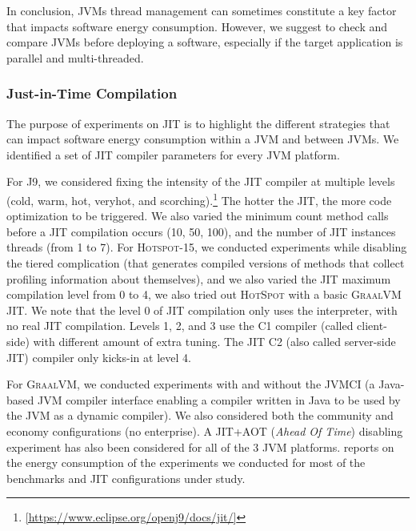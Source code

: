 In conclusion, JVMs thread management can sometimes constitute a key factor that impacts software energy consumption.
However, we suggest to check and compare JVMs before deploying a software, especially if the target application is parallel and multi-threaded.


\subsubsection{Just-in-Time Compilation}
The purpose of experiments on JIT is to highlight the different strategies that can impact software energy consumption within a JVM and between JVMs.
We identified a set of JIT compiler parameters for every JVM platform.

For \textsc{J9}, we considered fixing the intensity of the JIT compiler at multiple levels (\textsf{cold}, \textsf{warm}, \textsf{hot}, \textsf{veryhot}, and \textsf{scorching}).\footnote{\url{[https://www.eclipse.org/openj9/docs/jit/]}}
The hotter the JIT, the more code optimization to be triggered.
We also varied the minimum count method calls before a JIT compilation occurs (\textsf{10}, \textsf{50}, \textsf{100}), and the number of JIT instances threads (from \textsf{1} to \textsf{7}).
For \textsc{Hotspot-15}, we conducted experiments while disabling the tiered complication (that generates compiled versions of methods that collect profiling information about themselves), and we also varied the JIT maximum compilation level from \textsf{0} to \textsf{4}, we also tried out \textsc{HotSpot} with a basic \textsc{GraalVM} JIT.
We note that the level 0 of JIT compilation only uses the interpreter, with no real JIT compilation.
Levels 1, 2, and 3 use the C1 compiler (called client-side) with different amount of extra tuning.
The JIT C2 (also called server-side JIT) compiler only kicks-in at level 4.

For \textsc{GraalVM}, we conducted experiments with and without the JVMCI (a Java-based JVM compiler interface enabling a compiler written in Java to be used by the JVM as a dynamic compiler).
We also considered both the community and economy configurations (no enterprise).
A JIT+AOT (\emph{Ahead Of Time}) disabling experiment has also been considered for all of the 3 JVM platforms.
 reports on the energy consumption of the experiments we conducted for most of the benchmarks and JIT configurations under study.



